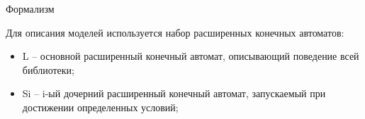 \documentclass[12pt]{beamer}
\begin{document}
{
\begin{frame}[fragile]{Формализм}
  \begin{mybox}[]
  Для описания моделей используется набор расширенных конечных автоматов:
  \begin{itemize}
  	\item L – основной расширенный конечный автомат, описывающий поведение всей библиотеки;
  	\item Si – i-ый дочерний расширенный конечный автомат, запускаемый при достижении определенных условий;
  \end{itemize}
  \end{mybox}
\end{frame}
}
\end{document}
